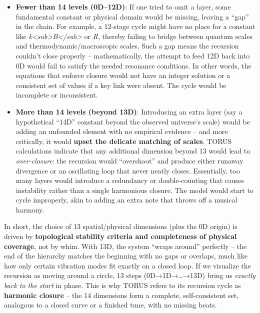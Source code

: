 \documentclass[
]{article}
\begin{document}
\begin{itemize}
\item
  \textbf{Fewer than 14 levels (0D--12D)}: If one tried to omit a layer,
  some fundamental constant or physical domain would be missing, leaving
  a ``gap'' in the chain. For example, a 12-stage cycle might have no
  place for a constant like
  \emph{k\textless sub\textgreater B\textless/sub\textgreater{}} or
  \emph{R}, thereby failing to bridge between quantum scales and
  thermodynamic/macroscopic scales\hspace{0pt}. Such a gap means the
  recursion couldn't close properly -- mathematically, the attempt to
  feed 12D back into 0D would fail to satisfy the needed resonance
  conditions. In other words, the equations that enforce closure would
  not have an integer solution or a consistent set of values if a key
  link were absent\hspace{0pt}. The cycle would be incomplete or
  inconsistent.
\item
  \textbf{More than 14 levels (beyond 13D)}: Introducing an extra layer
  (say a hypothetical ``14D'' constant beyond the observed universe's
  scale) would be adding an unfounded element with no empirical evidence
  -- and more critically, it would \textbf{upset the delicate matching
  of scales}. TORUS calculations indicate that any additional dimension
  beyond 13 would lead to \emph{over-closure}: the recursion would
  ``overshoot'' and produce either runaway divergence or an oscillating
  loop that never neatly closes\hspace{0pt}. Essentially, too many
  layers would introduce a redundancy or double-counting that causes
  instability rather than a single harmonious closure. The model would
  start to cycle improperly, akin to adding an extra note that throws
  off a musical harmony.
\end{itemize}

In short, the choice of 13 spatial/physical dimensions (plus the 0D
origin) is driven by \textbf{topological stability criteria and
completeness of physical coverage}, not by whim\hspace{0pt}. With 13D,
the system ``wraps around'' perfectly -- the end of the hierarchy
matches the beginning with no gaps or overlaps, much like how only
certain vibration modes fit exactly on a closed loop\hspace{0pt}. If we
visualize the recursion as moving around a circle, 13 steps
(0D→1D→\ldots→13D) bring us \emph{exactly back to the start} in phase.
This is why TORUS refers to its recursion cycle as \textbf{harmonic
closure} -- the 14 dimensions form a complete, self-consistent set,
analogous to a closed curve or a finished tune, with no missing beats.
\end{document}
